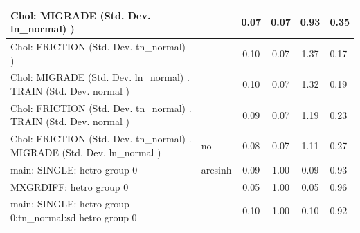\begin{table}
\begin{center}
\begin{tabular}{|l|l|c|c|c|l|}
			\hline
			 Chol: MIGRADE (Std. Dev. ln_normal) ) &  & 0.07 & 0.07 & 0.93 & 0.35 \\
			\hline
			 Chol: FRICTION (Std. Dev. tn_normal) ) &  & 0.10 & 0.07 & 1.37 & 0.17 \\
			\hline
			 Chol: MIGRADE (Std. Dev. ln_normal) . TRAIN (Std. Dev.   normal ) &  & 0.10 & 0.07 & 1.32 & 0.19 \\
			\hline
			 Chol: FRICTION (Std. Dev. tn_normal) . TRAIN (Std. Dev.   normal ) &  & 0.09 & 0.07 & 1.19 & 0.23 \\
			\hline
			 Chol: FRICTION (Std. Dev. tn_normal) . MIGRADE (Std. Dev.   ln_normal ) & no & 0.08 & 0.07 & 1.11 & 0.27 \\
			\hline
			main: SINGLE: hetro group 0 & arcsinh & 0.09 & 1.00 & 0.09 & 0.93 \\
			\hline
			MXGRDIFF: hetro group 0 &  & 0.05 & 1.00 & 0.05 & 0.96 \\
			\hline
			main: SINGLE: hetro group 0:tn_normal:sd  hetro group 0 &  & 0.10 & 1.00 & 0.10 & 0.92 \\
			\hline
		\end{tabular}
	\end{center}
\end{table}